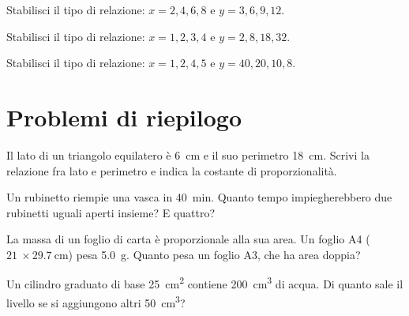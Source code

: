 \begin{esercizio}
Stabilisci il tipo di relazione: \; $x = 2,4,6,8$ \; e \; $y = 3,6,9,12$.\\
\end{esercizio}

\begin{esercizio}
Stabilisci il tipo di relazione: \; $x = 1,2,3,4$ \; e \; $y = 2,8,18,32$.\\
\end{esercizio}

\begin{esercizio}
Stabilisci il tipo di relazione: \; $x = 1,2,4,5$ \; e \; $y = 40,20,10,8$.\\
\end{esercizio}

\section{Problemi di riepilogo}

\begin{esercizio}
Il lato di un triangolo equilatero è \SI{6}{\centi\metre} e il suo perimetro \SI{18}{\centi\metre}. Scrivi la relazione fra lato e perimetro e indica la costante di proporzionalità.\\
\end{esercizio}

\begin{esercizio}
Un rubinetto riempie una vasca in \SI{40}{\minute}. Quanto tempo impiegherebbero due rubinetti uguali aperti insieme? E quattro?\\
\end{esercizio}

\begin{esercizio}
La massa di un foglio di carta è proporzionale alla sua area. Un foglio A4 ($\SI{21}{}\times\SI{29,7}{\centi\metre}$) pesa \SI{5,0}{\gram}. Quanto pesa un foglio A3, che ha area doppia?\\
\end{esercizio}

\begin{esercizio}
Un cilindro graduato di base \SI{25}{\centi\metre\squared} contiene \SI{200}{\centi\metre\cubed} di acqua. Di quanto sale il livello se si aggiungono altri \SI{50}{\centi\metre\cubed}?\\
\end{esercizio}

